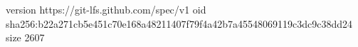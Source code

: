 version https://git-lfs.github.com/spec/v1
oid sha256:b22a271cb5e451c70e168a48211407f79f4a42b7a45548069119c3dc9c38dd24
size 2607
